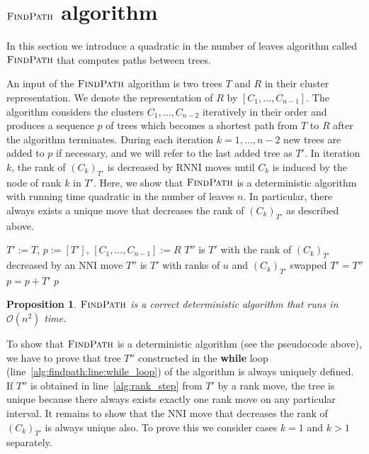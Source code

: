 \documentclass[11pt]{amsart}
\newtheorem{proposition}{Proposition}
\newcommand{\rnni}{\mathrm{RNNI}}
\newcommand{\findpath}{\textsc{FindPath}}
\newcommand{\rank}{\mathrm{rank}}
\newcommand{\nni}{\mathrm{NNI}}
\renewcommand{\O}{\mathcal O}
\begin{document}
\section{$\findpath$ algorithm}
\label{sec:rnni_complexity}

In this section we introduce a quadratic in the number of leaves algorithm called $\findpath$ that computes paths between trees.

An input of the $\findpath$ algorithm is two trees $T$ and $R$ in their cluster representation.
We denote the representation of $R$ by $[C_1, \ldots, C_{n-1}]$.
The algorithm considers the clusters $C_1, \ldots, C_{n-2}$ iteratively in their order and produces a sequence $p$ of trees which becomes a shortest path from $T$ to $R$ after the algorithm terminates.
During each iteration $k = 1, \ldots, n-2$ new trees are added to $p$ if necessary, and we will refer to the last added tree as $T'$.
In iteration $k$, the rank of $(C_{k})_{T'}$ is decreased by $\rnni$ moves until $C_k$ is induced by the node of rank $k$ in $T'$.
Here, we show that $\findpath$ is a deterministic algorithm with running time quadratic in the number of leaves $n$.
In particular, there always exists a unique move that decreases the rank of $(C_{k})_{T'}$ as described above.

\begin{algorithm}[H]
\caption{$\findpath$($T,R$)}
\begin{algorithmic}[1]
\STATE $T' := T$, $p := [T']$, $[C_1, \ldots, C_{n-1}] := R$
\label{alg:findpath:line:for_loop}
	\WHILE {$\rank((C_k)_{T'})>k$}
	\label{alg:findpath:line:while_loop}
			\STATE $T''$ is $T'$ with the rank of $(C_k)_{T'}$ decreased by an $\nni$ move
			\label{alg:nni_step}
		\ELSE
			\STATE $T''$ is $T'$ with ranks of $u$ and $(C_k)_{T'}$ swapped
			\label{alg:rank_step}
		\ENDIF
		\STATE $T' = T''$
		\STATE $p = p+T'$
	\ENDWHILE
\ENDFOR
\RETURN $p$
\end{algorithmic}
\end{algorithm}

\begin{proposition}
$\findpath$ is a correct deterministic algorithm that runs in $\O(n^2)$ time.
\end{proposition}

\proof
{}
To show that $\findpath$ is a deterministic algorithm (see the pseudocode above), we have to prove that tree $T''$ constructed in the \textbf{while} loop (line~\ref{alg:findpath:line:while_loop}) of the algorithm is always uniquely defined.
If $T''$ is obtained in line~\ref{alg:rank_step} from $T'$ by a rank move, the tree is unique because there always exists exactly one rank move on any particular interval.
It remains to show that the $\nni$ move that decreases the rank of $(C_k)_{T'}$ is always unique also.
To prove this we consider cases $k = 1$ and $k > 1$ separately.
\end{document}
